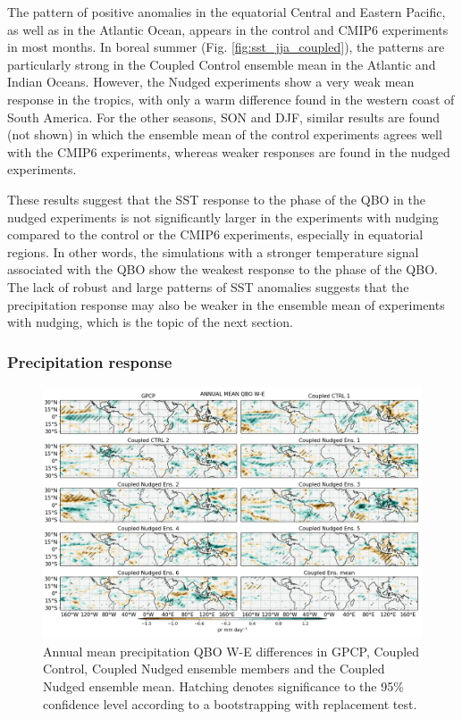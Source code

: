 The pattern of positive anomalies in the equatorial Central and Eastern Pacific, as well as in the Atlantic Ocean, appears in the control and CMIP6 experiments in most months. 
In boreal summer (Fig. \ref{fig:sst_jja_coupled}), the patterns are particularly strong in the Coupled Control ensemble mean in the Atlantic and Indian Oceans. However, the Nudged experiments show a very weak mean response in the tropics, with only a warm difference found in the western coast of South America. 
For the other seasons, SON and DJF, similar results are found (not shown) in which the ensemble mean of the control experiments agrees well with the CMIP6 experiments, whereas weaker responses are found in the nudged experiments.

These results suggest that the SST response to the phase of the QBO in the nudged experiments is not significantly larger in the experiments with nudging compared to the control or the CMIP6 experiments, especially in equatorial regions. 
In other words, the simulations with a stronger temperature signal associated with the QBO show the  weakest response to the phase of the QBO.
The lack of robust and large patterns of SST anomalies suggests that the precipitation response may also be weaker in the ensemble mean of experiments with nudging, which is the topic of the next section.

\subsubsection{Precipitation response}

\begin{figure}[t!]
\centering
 \includegraphics[width=\linewidth]{figures/pr_check_climqbowqboe.png}
\caption[Precipitation response to the QBO in coupled nudged experiments]{ Annual mean precipitation QBO W-E differences in GPCP, Coupled Control, Coupled Nudged ensemble members and the Coupled Nudged ensemble mean. Hatching denotes significance to the 95\% confidence level according to a bootstrapping with replacement test.}
\label{fig:pr_clim_coupled}
\end{figure}


